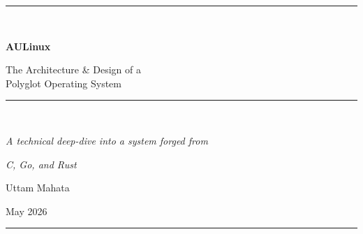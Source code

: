 \documentclass[11pt, a4paper, openany]{book}
\begin{document}
\begin{titlepage}
\thispagestyle{empty}
\centering
\vspace*{\fill}
{\color{aurule}\rule{\linewidth}{1.5pt}}\\[2.0em]
{\sffamily\Huge\bfseries\color{auprimary} AULinux\par}
\vspace{0.6em}
{\sffamily\LARGE\color{auaccent} The Architecture \& Design of a\\ Polyglot Operating System\par}
\vspace{1.2em}
{\color{aurule}\rule{0.5\linewidth}{1pt}}\\[1.6em]
{\large\itshape A technical deep-dive into a system forged from\par}
{\large\itshape \textcolor{aukernel}{C}, \textcolor{auteal}{Go}, and \textcolor{aurust}{Rust}\par}
\vspace{3.2em}
{\Large\sffamily Uttam Mahata\par}
\vspace{0.4em}
{\large May 2026\par}
\vspace*{\fill}
{\color{aurule}\rule{\linewidth}{1.5pt}}
\end{titlepage}

\frontmatter
\pagestyle{plain}
\tableofcontents
\cleardoublepage

\mainmatter
\pagestyle{fancy}







\end{document}
